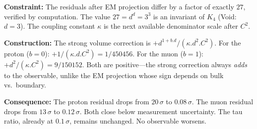 \documentclass[11pt,a4paper]{book}
\def\cdot{.}%
\begin{document}
\medskip
\noindent
\textbf{Constraint:}
The residuals after EM projection differ by a factor of exactly $27$,
verified by computation.  The value $27 = d^d = 3^3$ is an invariant
of $K_4$ (Void: $d = 3$).  The coupling constant $\kappa$ is the
next available denominator scale after $C^2$.

\medskip
\noindent
\textbf{Construction:}
The strong volume correction is
$+ d^{1+b \cdot d}/(\kappa \cdot d^2 \cdot C^2)$.
For the proton ($b = 0$): $+1/(\kappa \cdot d \cdot C^2) = 1/450456$.
For the muon ($b = 1$): $+d^2/(\kappa \cdot C^2) = 9/150152$.
Both are positive---the strong correction always \emph{adds} to the
observable, unlike the EM projection whose sign depends on bulk vs.\
boundary.

\medskip
\noindent
\textbf{Consequence:}
The proton residual drops from $20\,\sigma$ to $0.08\,\sigma$.
The muon residual drops from $13\,\sigma$ to $0.12\,\sigma$.
Both close below measurement uncertainty.  The tau ratio, already
at $0.1\,\sigma$, remains unchanged.  No observable worsens.
\end{document}
